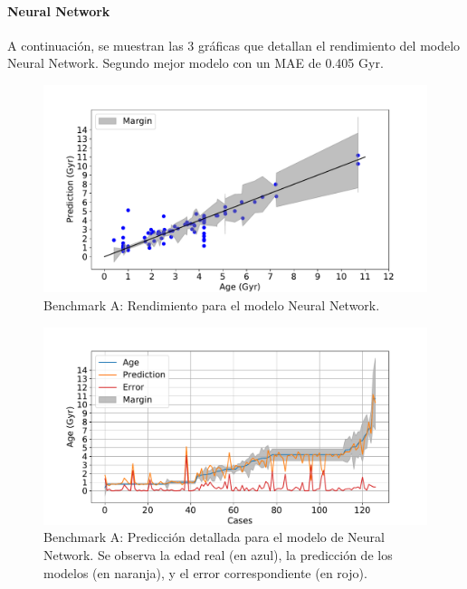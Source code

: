 \paragraph{Neural Network} 
A continuación, se muestran las 3 gráficas que detallan el rendimiento del modelo Neural Network. Segundo mejor modelo con un MAE de 0.405 Gyr.

\begin{figure}[H]
\begin{center}
 \includegraphics[width=0.8\linewidth]{Figuras/Experimentos/B_A_nnet_1.pdf}
\end{center}
\caption{Benchmark A: Rendimiento para el modelo Neural Network.}
 \label{fig:benchA_details_nnet_1}
\end{figure}

\begin{figure}[H]
\begin{center}
 \includegraphics[width=0.8\linewidth]{Figuras/Experimentos/B_A_nnet_2.pdf}
\end{center}
\caption{Benchmark A: Predicción detallada para el modelo de Neural Network. Se observa la edad real (en azul), la predicción de los modelos (en naranja), y el error correspondiente (en rojo).}
 \label{fig:benchA_details_nnet_2}
\end{figure}

